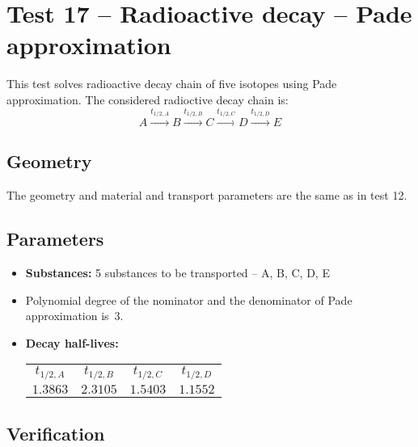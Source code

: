 

\section{Test 17 -- Radioactive decay -- Pade approximation}
This test solves radioactive decay chain of five isotopes using Pade approximation.
The considered radioctive decay chain is:
\[
 A\xrightarrow{t_{1/2,A}}B\xrightarrow{t_{1/2,B}}C\xrightarrow{t_{1/2,C}}D\xrightarrow{t_{1/2,D}}E
\]

\subsection*{Geometry}
The geometry and material and transport parameters are the same as in test 12.


\subsection*{Parameters}
\begin{itemize}
  \item \textbf{Substances:} 5 substances to be transported -- A, B, C, D, E
  \item Polynomial degree of the nominator and the denominator of Pade approximation is~3.
  \item \textbf{Decay half-lives:} 
    \begin{tabular}[c]{|c|c|c|c|}
      \hline
      $t_{1/2,A}$ & $t_{1/2,B}$  & $t_{1/2,C}$ & $t_{1/2,D}$\\[4pt]
      $1.3863$ & $2.3105$ & $1.5403$ & $1.1552$\\[4pt]
      \hline
    \end{tabular}
\end{itemize}

\subsection*{Verification}